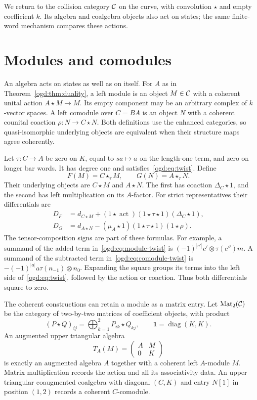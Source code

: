 We return to the collision category $\mathcal C$ on the curve, with convolution
$\star$ and empty coefficient $k$. Its algebra and coalgebra objects also
act on states; the same finite-word mechanism compares these actions.

\section{Modules and comodules}\label{ogd:sec:modules}

An algebra acts on states as well as on itself.
For \(A\) as in Theorem~\ref{ogd:thm:duality}, a left module is an object \(M\in\mathcal C\) with a coherent unital action \(A\star M\to M\).
Its empty component may be an arbitrary complex of \(k\)-vector spaces.
A\label{ogd:def:bar-comodule-coalgebra} left comodule over \(C=BA\) is an object \(N\) with a coherent counital coaction \(\rho:N\to C\star N\).
Both definitions use the enhanced categories, so quasi-isomorphic underlying objects are equivalent when their structure maps agree coherently.

Let\label{ogd:def:module-twisting-cochain} \(\tau:C\to A\) be zero on \(K\), equal to \(sa\mapsto a\) on the length-one term, and zero on longer bar words.
It has degree one and satisfies~\eqref{ogd:eq:twist}.
Define\label{ogd:def:module-comodule-twisting-functors}
\[
 F(M)=C\star_\tau M,\qquad G(N)=A\star_\tau N.
\]
Their underlying objects are \(C\star M\) and \(A\star N\).
The first has coaction \(\Delta_C\star1\), and the second has left multiplication on its \(A\)-factor.
For strict representatives their differentials are
\begin{align}
 D_F&=d_{C\star M}+
 (1\star\operatorname{act})(1\star\tau\star1)(\Delta_C\star1),\label{ogd:eq:module-twist}\\
 D_G&=d_{A\star N}-
 (\mu_A\star1)(1\star\tau\star1)(1\star\rho).\label{ogd:eq:comodule-twist}
\end{align}
The tensor-composition signs are part of these formulas.
For example, a summand of the added term in~\eqref{ogd:eq:module-twist} is
\((-1)^{|c'|}c'\otimes\tau(c'')m\).
A summand of the subtracted term in~\eqref{ogd:eq:comodule-twist} is
\(-(-1)^{|a|}a\tau(n_{-1})\otimes n_0\).
Expanding the square groups its terms into the left side of~\eqref{ogd:eq:twist}, followed by the action or coaction.
Thus both differentials square to zero.

The coherent constructions can retain a module as a matrix entry.
Let\label{ogd:def:matrix-coefficient-category} $\operatorname{Mat}_2(\mathcal C)$ be the category of two-by-two matrices of coefficient objects, with product
\[
 (P\star Q)_{ij}=\bigoplus_{k=1}^2P_{ik}\star Q_{kj},
 \qquad \mathbf1=\operatorname{diag}(K,K).
\]
An augmented upper triangular algebra
\[
 T_A(M)=\begin{pmatrix}A&M\\0&K\end{pmatrix}
\]
is exactly an augmented algebra $A$ together with a coherent left $A$-module $M$.
Matrix multiplication records the action and all its associativity data.
An upper triangular coaugmented coalgebra with diagonal $(C,K)$ and entry $N[1]$ in position $(1,2)$ records a coherent $C$-comodule.

